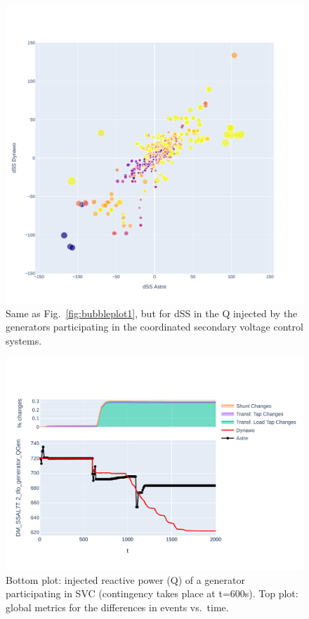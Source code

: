 \documentclass[conference]{IEEEtran}
\begin{document}
\begin{figure}
  \centering
  \includegraphics[width=\columnwidth]{figs/Qgen_dSS_GENS_20210211-0930_moreT600}
  \caption{Same as Fig.~\ref{fig:bubbleplot1}, but for dSS in the Q
    injected by the generators participating in the coordinated
    secondary voltage control systems.}
  \label{fig:bubbleplot2}
\end{figure}

\begin{figure}
  \centering
  \includegraphics[width=\columnwidth]{figs/Qgen_curve_GENS_20210211-0930_moreT600}
  \caption{Bottom plot: injected reactive power (Q) of a generator
    participating in SVC (contingency takes place at t=600s). Top
    plot: global metrics for the differences in events vs.\ time.}
  \label{fig:curveplot}
\end{figure}
\end{document}
